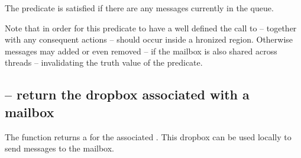 
\noindent
The  predicate is satisfied if there are any messages currently in the  queue. 

\begin{aside}
Note that in order for this predicate to have a well defined  the call to  -- together with any consequent actions -- should occur inside a hronized region. Otherwise messages may added or even removed -- if the mailbox is also shared across threads -- invalidating the truth value of the  predicate.
\end{aside}

\subsection{ -- return the dropbox associated with a mailbox}
\label{mbox:dropbox}

The  function returns a  for the associated . This dropbox can be used locally to send messages to the mailbox.


%



